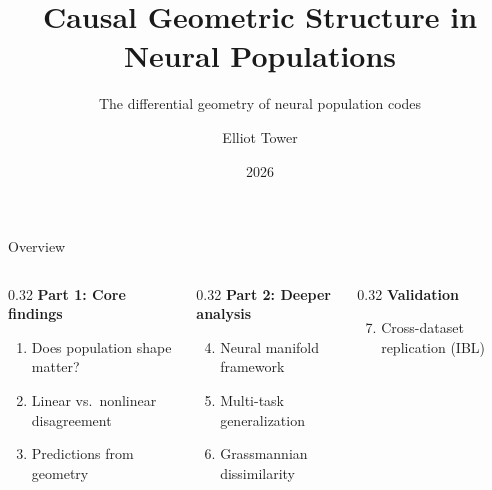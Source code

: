 \documentclass[aspectratio=169,11pt]{beamer}
\title{Causal Geometric Structure in Neural Populations}
\subtitle{The differential geometry of neural population codes}
\author{Elliot Tower}
\date{2026}
\institute{}
\begin{document}
\maketitle

\begin{frame}{Overview}

\begin{columns}[T]
\begin{column}{0.32\textwidth}
\textbf{Part 1: Core findings}
{\small
\begin{enumerate}
  \item Does population shape matter?
  \item Linear vs.\ nonlinear disagreement
  \item Predictions from geometry
\end{enumerate}
}
\end{column}
\begin{column}{0.32\textwidth}
\textbf{Part 2: Deeper analysis}
{\small
\begin{enumerate}
  \setcounter{enumi}{3}
  \item Neural manifold framework
  \item Multi-task generalization
  \item Grassmannian dissimilarity
\end{enumerate}
}
\end{column}
\begin{column}{0.32\textwidth}
\textbf{Validation}
{\small
\begin{enumerate}
  \setcounter{enumi}{6}
  \item Cross-dataset replication (IBL)
\end{enumerate}
}
\end{column}
\end{columns}
\end{frame}
\end{document}
